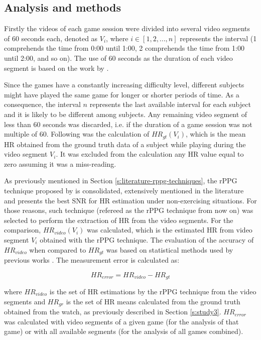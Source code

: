 \subsection{Analysis and methods}

Firstly the videos of each game session were divided into several video segments of 60 seconds each, denoted as $V_i$, where $i \in [1, 2, ..., n]$ represents the interval (1 comprehends the time from 0:00 until 1:00, 2 comprehends the time from 1:00 until 2:00, and so on). The use of 60 seconds as the duration of each video segment is based on the work by \textcite{poh2011advancements}.

Since the games have a constantly increasing difficulty level, different subjects might have played the same game for longer or shorter periods of time. As a consequence, the interval $n$ represents the last available interval for each subject and it is likely to be different among subjects. Any remaining video segment of less than 60 seconds was discarded, i.e. if the duration of a game session was not multiple of 60. Following was the calculation of $HR_{gt}(V_i)$, which is the mean HR obtained from the ground truth data of a subject while playing during the video segment $V_i$. It was excluded from the calculation any HR value equal to zero assuming it was a miss-reading.

As previously mentioned in Section \ref{s:literature-rppg-techniques}, the rPPG technique proposed by \textcite{poh2011advancements} is consolidated, extensively mentioned in the literature and presents the best SNR for HR estimation under non-exercising situations. For those reasons, such technique  (refereed as the rPPG technique from now on) was selected to perform the extraction of HR from the video segments. For the comparison, $HR_{video}(V_i)$ was calculated, which is the estimated HR from video segment $V_i$ obtained with the rPPG technique. The evaluation of the accuracy of $HR_{video}$ when compared to $HR_{gt}$ was based on statistical methods used by previous works \parencite{poh2011advancements, rouast2016remote, li2014remote}. The measurement error is calculated as:

\begin{equation}
\label{eqn:hr-error}
HR_{error} = HR_{video} - HR_{gt}
\end{equation}

where $HR_{video}$ is the set of HR estimations by the rPPG technique from the video segments and $HR_{gr}$ is the set of HR means calculated from the ground truth obtained from the watch, as previously described in Section \ref{s:study3}. $HR_{error}$ was calculated with video segments of a given game (for the analysis of that game) or with all available segments (for the analysis of all games combined).

